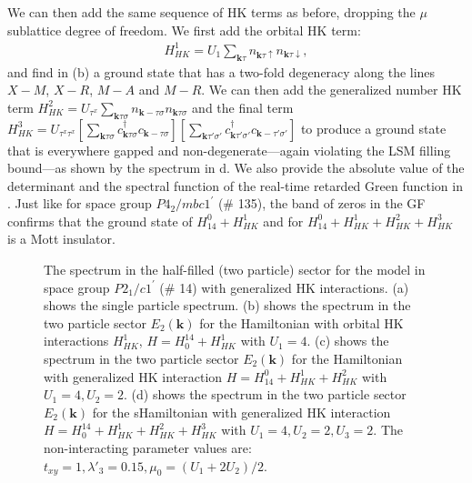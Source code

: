 \documentclass[prb,aps,amssymb,twocolumn,notitlepage]{revtex4-2}
\begin{document}
We can then add the same sequence of HK terms as before, dropping the $\mu$ sublattice degree of freedom. 
We first add the orbital HK term:
\noindent
\begin{align}
H^{1}_{HK}=U_{1}\sum_{\mathbf{k}\tau}n_{\mathbf{k}\tau\uparrow}n_{\mathbf{k}\tau\downarrow},
\end{align}
and find in (b) a ground state that has a two-fold degeneracy along the lines $X-M$, $X-R$, $M-A$ and $M-R$.
We can then add the generalized number HK term $
H^{2}_{HK}=U_{\tau^x}\sum_{\mathbf{k}\tau\sigma}n_{\mathbf{k}-\tau\sigma}n_{\mathbf{k}\tau\sigma}
$ 
and the final term $H^{3}_{HK}=U_{\tau^x\tau^x}\left[\sum_{\mathbf{k}\tau\sigma}c^\dagger_{\mathbf{k}\tau\sigma}c_{\mathbf{k}-\tau\sigma}\right]\left[\sum_{\mathbf{k}\tau'\sigma'}c^\dagger_{\mathbf{k}\tau'\sigma'}c_{\mathbf{k}-\tau'\sigma'}\right]$ to produce a ground state that is everywhere gapped and non-degenerate---again violating the LSM filling bound---as shown by the spectrum in d. 
We also provide the absolute value of the determinant and the spectral function of the real-time retarded Green function in . 
Just like for space group $P4_2/mbc1^\prime$ (\# 135), the band of zeros in the GF confirms that the ground state of $H^{0}_{14}+H^{1}_{HK}$ and for $H^{0}_{14}+H^{1}_{HK}+H^{2}_{HK}+H^{3}_{HK}$  is a Mott insulator.

\begin{figure*}
\caption{The spectrum in the half-filled (two particle) sector for the model in space group $P2_1/c1^\prime$ (\# 14) with generalized HK interactions. 
(a) shows the single particle spectrum. 
(b) shows the spectrum in the two particle sector $E_{2}(\mathbf{k})$ for the Hamiltonian with orbital HK interactions $H^{1}_{HK}$, $H=H^{14}_{0}+H^{1}_{HK}$ with $U_{1}=4$.
(c) shows the spectrum in the two particle sector $E_{2}(\mathbf{k})$ for the Hamiltonian with generalized HK interaction $H=H^{0}_{14}+H^{1}_{HK}+H^{2}_{HK}$ with $U_{1}=4,U_{2}=2$. 
(d) shows the spectrum in the two particle sector $E_{2}(\mathbf{k})$ for the sHamiltonian with generalized HK interaction $H=H^{14}_{0}+H^{1}_{HK}+H^{2}_{HK}+H^{3}_{HK}$ with $U_{1}=4,U_{2}=2, U_{3}=2$.
The non-interacting parameter values are: $t_{xy}=1, \lambda'_{3}=0.15, \mu_{0}=(U_{1}+2U_{2})/2$.}
\label{fig:SG14}
\end{figure*}
\end{document}
